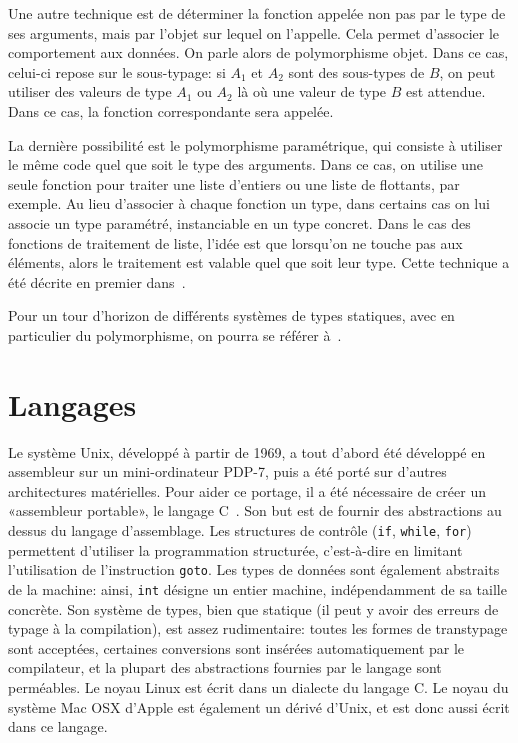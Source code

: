 Une autre technique est de déterminer la fonction appelée non pas par le type de
ses arguments, mais par l'objet sur lequel on l'appelle. Cela permet d'associer
le comportement aux données. On parle alors de polymorphisme objet. Dans ce cas,
celui-ci repose sur le sous-typage: si $A_1$ et $A_2$ sont des sous-types de
$B$, on peut utiliser des valeurs de type $A_1$ ou $A_2$ là où une valeur de
type $B$ est attendue. Dans ce cas, la fonction correspondante sera appelée.

La dernière possibilité est le polymorphisme paramétrique, qui consiste à
utiliser le \linebreak même code quel que soit le type des arguments. Dans ce
cas, on utilise une seule fonction pour traiter une liste d'entiers ou une liste
de flottants, par exemple. Au lieu d'associer à chaque fonction un type, dans
certains cas on lui associe un type paramétré, instanciable en un type concret.
Dans le cas des fonctions de traitement de liste, l'idée est que lorsqu'on ne
touche pas aux éléments, alors le traitement est valable quel que soit leur
type. Cette technique a été décrite en premier dans~\cite{Milner78}.

Pour un tour d'horizon de différents systèmes de types statiques, avec en
particulier du polymorphisme, on pourra se référer à~\cite{TAPL}.

\section{Langages}

Le système Unix, développé à partir de 1969, a tout d'abord été développé en
assembleur sur un mini-ordinateur PDP-7, puis a été porté sur d'autres
architectures matérielles. Pour aider ce portage, il a été nécessaire de créer
un «assembleur portable», le langage C~\cite{KandR,AnsiC}. Son but est de
fournir des abstractions au dessus du langage d'assemblage. Les structures de
contrôle (\texttt{if}, \texttt{while}, \texttt{for}) permettent d'utiliser la
programmation structurée, c'est-à-dire en limitant l'utilisation de
l'instruction \texttt{goto}. Les types de données sont également abstraits de la
machine: ainsi, \texttt{int} désigne un entier machine, indépendamment de sa
taille concrète. Son système de types, bien que statique (il peut y avoir des
erreurs de typage à la compilation), est assez rudimentaire: toutes les formes
de transtypage sont acceptées, certaines conversions sont insérées
automatiquement par le compilateur, et la plupart des abstractions fournies par
le langage sont perméables. Le noyau Linux est écrit dans un dialecte du langage
C. Le noyau du système Mac OSX d'Apple est également un dérivé d'Unix, et est
donc aussi écrit dans ce langage.

